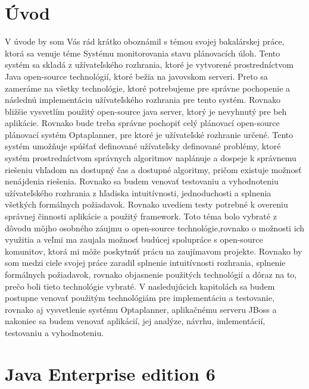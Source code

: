 

\chapter{Úvod}
V úvode by som Vás rád krátko oboznámil s témou svojej bakalárskej práce, ktorá sa venuje téme Systému monitorovania stavu plánovacích úloh. Tento systém sa skladá z užívateľského rozhrania, ktoré je vytvorené prostredníctvom Java open-source technológií, ktoré bežia na javovskom serveri. Preto sa zameráme na všetky technológie, ktoré potrebujeme pre správne pochopenie a následnú implementáciu užívateľského rozhrania pre tento systém. Rovnako bližšie vysvetlím použitý open-source java server, ktorý je nevyhnutý pre beh aplikácie. Rovnako bude treba správne pochopiť celý plánovací open-source plánovací systém Optaplanner, pre ktoré je užívateľské rozhranie určené. Tento systém umožňuje spúšťať definované užívateľsky definované problémy, ktoré systém prostredníctvom správnych algoritmov naplánuje a dospeje k správnemu riešeniu vhľadom na dostupný čas a dostupné algoritmy, pričom existuje možnosť nenájdenia riešenia. Rovnako sa budem venovať testovaniu a vyhodnoteniu užívateľského rozhrania z hľadiska intuitívnosti, jednoduchosti a splnenia všetkých formálnych požiadavok. Rovnako uvediem testy potrebné k overeniu správnej činnosti aplikácie a použitý framework. Toto téma bolo vybraté z dôvodu môjho osobného záujmu o open-source technológie,rovnako o možnosti ich využitia a veľmi ma zaujala možnosť budúcej spolupráce s open-source komunitov, ktorá mi môže poskytnúť prácu na zaujímavom projekte. Rovnako by som medzi ciele svojej práce zaradil splnenie intuitívnosti rozhrania, splnenie formálnych požiadavok, rovnako objasnenie použitých technológií a dôraz na to, prečo boli tieto technológie vybraté. V nasledujúcich kapitolách sa budem postupne venovať použitým technológiám pre implementáciu a testovanie, rovnako aj vysvetlenie systému Optaplanner, aplikačnému serveru JBoss a nakoniec sa budem venovať aplikácií, jej analýze, návrhu, imlementácií, testovaniu a vyhodnoteniu.


\chapter{Java Enterprise edition 6}
